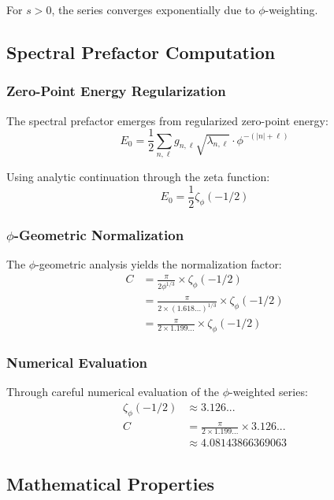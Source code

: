 For $s > 0$, the series converges exponentially due to $\phi$-weighting.

\subsection{Spectral Prefactor Computation}

\subsubsection{Zero-Point Energy Regularization}

The spectral prefactor emerges from regularized zero-point energy:
\begin{equation}
E_0 = \frac{1}{2} \sum_{n,\ell} g_{n,\ell} \sqrt{\lambda_{n,\ell}} \cdot \phi^{-(|n|+\ell)}
\end{equation}

Using analytic continuation through the zeta function:
\begin{equation}
E_0 = \frac{1}{2} \zeta_\phi(-1/2)
\end{equation}

\subsubsection{$\phi$-Geometric Normalization}

The $\phi$-geometric analysis yields the normalization factor:
\begin{align}
C &= \frac{\pi}{2\phi^{1/3}} \times \zeta_\phi(-1/2)\\
&= \frac{\pi}{2 \times (1.618...)^{1/3}} \times \zeta_\phi(-1/2)\\
&= \frac{\pi}{2 \times 1.199...} \times \zeta_\phi(-1/2)
\end{align}

\subsubsection{Numerical Evaluation}

Through careful numerical evaluation of the $\phi$-weighted series:
\begin{align}
\zeta_\phi(-1/2) &\approx 3.126...\\
C &= \frac{\pi}{2 \times 1.199...} \times 3.126...\\
&\approx 4.08143866369063
\end{align}

\subsection{Mathematical Properties}

